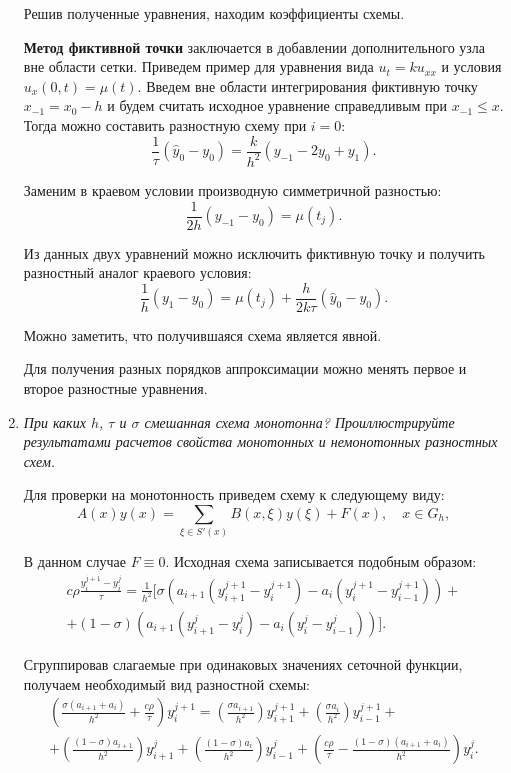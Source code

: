 \documentclass[12pt, a4paper]{article}
\begin{document}
\begin{enumerate}
		Решив полученные уравнения, находим коэффициенты схемы.
		
		\textbf{Метод фиктивной точки} заключается в добавлении дополнительного узла вне области сетки. Приведем пример для уравнения вида $u_t = k u_{xx}$ и условия $u_x(0, t) = \mu(t)$. Введем вне области интегрирования фиктивную точку $x_{-1} = x_0 - h$ и будем считать исходное уравнение справедливым при $x_{-1} \le x$. Тогда можно составить разностную схему при $i=0$:
		\[
		\frac1\tau (\hat{y}_0 - y_0) = \frac k{h^2} (y_{-1} - 2y_0 + y_1).
		\]
		
		Заменим в краевом условии производную симметричной разностью:
		\[
		\frac1{2h}(y_{-1} - y_0) = \mu(t_j). 
		\]
		
		Из данных двух уравнений можно исключить фиктивную точку и получить разностный аналог краевого условия:
		\[
		\frac1h(y_1 - y_0)=\mu(t_j) + \frac{h}{2k\tau}(\hat{y}_0 - y_0).
		\]
		
		Можно заметить, что получившаяся схема является явной.
		
		Для получения разных порядков аппроксимации можно менять первое и второе разностные уравнения.
		
		\item \textit{При каких $h$, $\tau$ и $\sigma$ смешанная схема монотонна? Проиллюстрируйте результатами расчетов свойства монотонных и немонотонных разностных схем.}
		\smallskip
		
		Для проверки на монотонность приведем схему к следующему виду:
		\[
		A(x)y(x) = \sum_{\xi\in S'(x)} B(x, \xi) y(\xi) + F(x), \quad x \in G_h,
		\]
		
		В данном случае $F \equiv 0$. Исходная схема записывается подобным образом:
		\begin{multline*}
			c \rho \frac{y_i^{j+1}-y_i^j}\tau = \frac1{h^2}\Big[\sigma \left(a_{i+1}(y_{i+1}^{j+1}-y_i^{j+1}) - a_i(y_i^{j+1}-y_{i-1}^{j+1})\right) + \\
			+ (1-\sigma)\left(a_{i+1}(y_{i+1}^j - y_i^j) - a_i (y_i^j - y_{i-1}^j)\right)\Big].
		\end{multline*}
		
		Сгруппировав слагаемые при одинаковых значениях сеточной функции, получаем необходимый вид разностной схемы:
		\begin{multline*}
			\left(\frac{\sigma (a_{i+1}+a_i)}{h^2} + \frac{c\rho}\tau\right)y_i^{j+1} = \left(\frac{\sigma a_{i+1}}{h^2}\right)y_{i+1}^{j+1} + \left(\frac{\sigma a_i}{h^2}\right)y_{i-1}^{j+1} + \\
			+ \left(\frac{(1-\sigma)a_{i+1}}{h^2}\right) y_{i+1}^j + \left(\frac{(1-\sigma)a_i}{h^2}\right) y_{i-1}^j + \left(\frac{c\rho}{\tau} - \frac{(1-\sigma)(a_{i+1} + a_i)}{h^2}\right) y_i^j.
		\end{multline*}
		

\end{enumerate}
\end{document}
